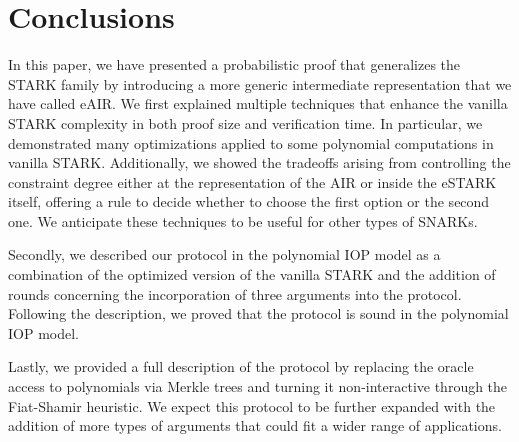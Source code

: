 
\section{Conclusions}\label{sec:conclusions}

In this paper, we have presented a probabilistic proof that generalizes the STARK family by introducing a more generic intermediate representation that we have called eAIR. We first explained multiple techniques that enhance the vanilla STARK complexity in both proof size and verification time. In particular, we demonstrated many optimizations applied to some polynomial computations in vanilla STARK. Additionally, we showed the tradeoffs arising from controlling the constraint degree either at the representation of the AIR or inside the eSTARK itself, offering a rule to decide whether to choose the first option or the second one. We anticipate these techniques to be useful for other types of SNARKs.

Secondly, we described our protocol in the polynomial IOP model as a combination of the optimized version of the vanilla STARK and the addition of rounds concerning the incorporation of three arguments into the protocol. Following the description, we proved that the protocol is sound in the polynomial IOP model.

Lastly, we provided a full description of the protocol by replacing the oracle access to polynomials via Merkle trees and turning it non-interactive through the Fiat-Shamir heuristic. We expect this protocol to be further expanded with the addition of more types of arguments that could fit a wider range of applications.